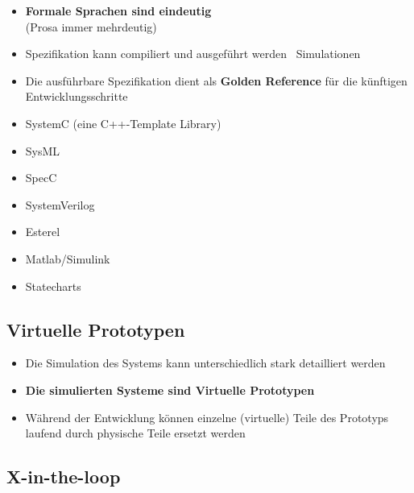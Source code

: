 \begin{minipage}[t]{0.48\columnwidth}
    \raggedright
    \begin{itemize}
    \item \textbf{Formale Sprachen sind eindeutig} \\
        (Prosa immer mehrdeutig)
    \item Spezifikation kann compiliert und ausgeführt werden \textrightarrow\ Simulationen
    \item Die ausführbare Spezifikation dient als \textbf{Golden Reference} für die künftigen Entwicklungsschritte
\end{itemize}
\end{minipage}
\hfill
\begin{minipage}[t]{0.48\columnwidth}

    \vspace{0.1cm}

    \begin{itemize}
        \item SystemC (eine C++-Template Library)
        \item SysML
        \item SpecC
        \item SystemVerilog
        \item Esterel
        \item Matlab/Simulink
        \item Statecharts
    \end{itemize}
\end{minipage}


\subsection{Virtuelle Prototypen}

\begin{itemize}
    \item Die Simulation des Systems kann unterschiedlich stark detailliert werden
    \item \textbf{Die simulierten Systeme sind Virtuelle Prototypen}
    \item Während der Entwicklung können einzelne (virtuelle) Teile des Prototyps laufend durch physische Teile
        ersetzt werden
\end{itemize}


\subsection{X-in-the-loop}

